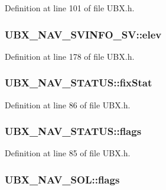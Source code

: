 Definition at line 101 of file U\-B\-X.\-h.

\hypertarget{group___g_s_p_module_ga8fad57e044674c92508262141a99a154}{
\subsubsection[{elev}]{ U\-B\-X\-\_\-\-N\-A\-V\-\_\-\-S\-V\-I\-N\-F\-O\-\_\-\-S\-V\-::elev}}\label{group___g_s_p_module_ga8fad57e044674c92508262141a99a154}


Definition at line 178 of file U\-B\-X.\-h.

\hypertarget{group___g_s_p_module_ga6c2f59170b7d3a57f1ce01120b735ed1}{
\subsubsection[{fix\-Stat}]{ U\-B\-X\-\_\-\-N\-A\-V\-\_\-\-S\-T\-A\-T\-U\-S\-::fix\-Stat}}\label{group___g_s_p_module_ga6c2f59170b7d3a57f1ce01120b735ed1}


Definition at line 86 of file U\-B\-X.\-h.

\hypertarget{group___g_s_p_module_ga06eed2ab154f7ab69c8a5f5acfbae99c}{
\subsubsection[{flags}]{ U\-B\-X\-\_\-\-N\-A\-V\-\_\-\-S\-T\-A\-T\-U\-S\-::flags}}\label{group___g_s_p_module_ga06eed2ab154f7ab69c8a5f5acfbae99c}


Definition at line 85 of file U\-B\-X.\-h.

\hypertarget{group___g_s_p_module_ga25c7a16be058569db8ae95b89abf3b42}{
\subsubsection[{flags}]{ U\-B\-X\-\_\-\-N\-A\-V\-\_\-\-S\-O\-L\-::flags}}\label{group___g_s_p_module_ga25c7a16be058569db8ae95b89abf3b42}


